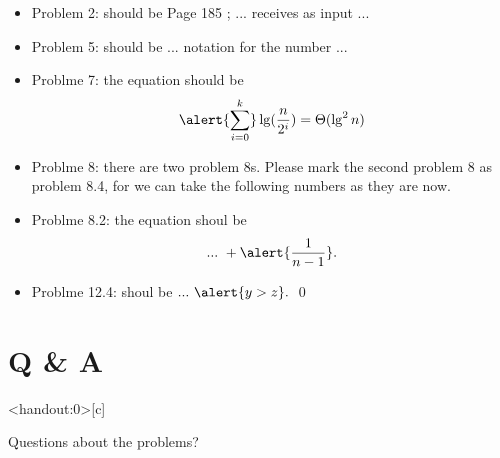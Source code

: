 \documentclass[handout]{beamer}
\begin{document}
    \begin{frame}[c,shrink]{\subsecname}
        \begin{itemize}
        \item
Problem 2: should be Page \alert{185} ; ... receives \alert{as} input ...
        \item
Problem 5: should be ... notation \alert{for} the number ...
        \item
Problme 7: the equation should be \[\alert{\sum^k_{i=0}}\lg(\frac{n}{2^i})=\Theta(\lg^2n)\]
        \item
Problme 8: there are \alert{two} problem 8s. Please mark \alert{the second problem 8} as \alert{problem 8.4}, for we can take the following numbers as they are now.
        \item
Problme 8.2: the equation shoul be \[...\ +\alert{\frac{1}{n-1}}.\]
        \item
Problme 12.4: shoul be $...\ \alert{y>z}.$ \qed
        \end{itemize}
    \end{frame}
        
        
        
\section*{Q \& A}

    \begin{frame}<handout:0>[c]{\secname}
        \centerline{\Huge{Questions about the problems?}}
    \end{frame}
    
    
    
\end{document}
